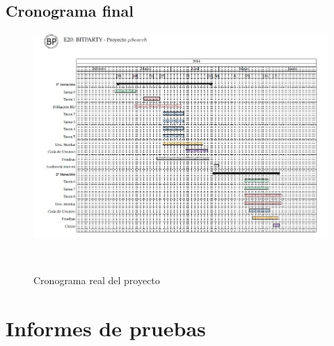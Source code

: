 \documentclass[10pt,spanish]{article}
\let\stdsection\section
\renewcommand\section{\newpage\stdsection}
\begin{document}
\subsection{Cronograma final}
%
\vspace{.2cm}
\begin{figure}[ht]
	\centerline{\includegraphics[scale=0.75]{img/cronograma_final}}\
	\caption{Cronograma real del proyecto}
	\label{fig:cronogramaFinal}
\end{figure}


\section{Informes de pruebas}\label{sec:informe_pruebas}

\end{document}
